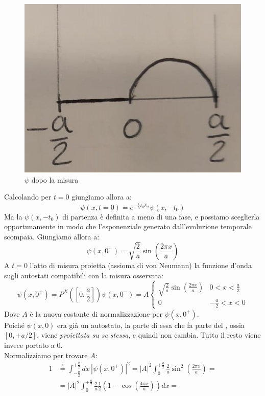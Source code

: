 \documentclass[../../FisicaTeorica.tex]{subfiles}
\begin{document}
\begin{enumerate}
\begin{figure}[H]
\centering
\includegraphics[scale=0.6]{Immagini/15_11/img3.jpeg}
\caption{$\psi$ dopo la misura}
\end{figure}
Calcolando per $t=0$ giungiamo allora a:
\[
\psi(x,t=0)=e^{-\frac{i}{\hbar}t_0\mathcal{E}_2} \psi(x,-t_0)
\]
Ma la $\psi(x,-t_0)$ di partenza è definita a meno di una fase, e possiamo sceglierla opportunamente in modo che l'esponenziale generato dall'evoluzione temporale scompaia.
Giungiamo allora a:
\[
\psi(x,0^-)=\sqrt{\frac{2}{a}} \sin\left(\frac{2\pi x}{a}\right)
\]
A $t=0$ l'atto di misura proietta (assioma di von Neumann) la funzione d'onda sugli autostati compatibili con la misura osservata:
\[
\psi(x,0^+) = P^X\left(\left[0,\frac{a}{2}\right]\right)\psi(x,0^-)=A\begin{cases}
\sqrt{\frac{2}{a}}\sin\left(\frac{2\pi x}{a}\right) & 0 <x<\frac{a}{2}\\
0 & -\frac{a}{2}<x<0
\end{cases}
\]
Dove $A$ è la nuova costante di normalizzazione per $\psi(x,0^+)$.\\
Poiché $\psi(x,0)$ era già un autostato, la parte di essa che fa parte del , ossia $[0,+a/2]$, viene \textit{proiettata su se stessa}, e quindi non cambia. Tutto il resto viene invece portato a $0$.\\
Normalizziamo per trovare $A$:
\begin{align*}
1&\overset{!}{=}\int_{-\frac{a}{2}}^{+\frac{a}{2}} dx\,|\psi(x,0^+)|^2 = |A|^2 \int_0^{+\frac{a}{2}} \frac{2}{a}\sin^2\left(\frac{2\pi x}{a}\right)=\\
&=|A|^2 \int_0^{+\frac{a}{2}} \frac{2}{a}\frac{1}{2}\left(1-\cos\left(\frac{4\pi x}{a}\right)\right) dx =\\

\end{align*}
\end{enumerate}
\end{document}
